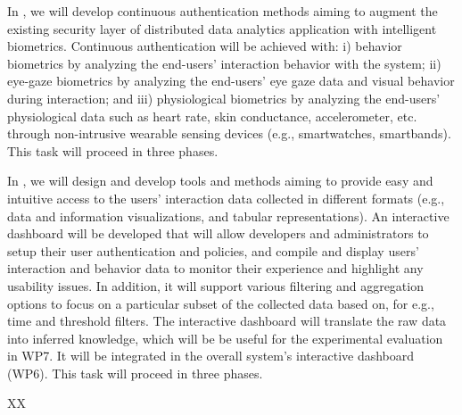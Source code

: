 \begin{Workpackage}{\thewpno}
\begin{Task}

\TaskResults{%
}
\TaskHeader{}

In \theTask, we will develop continuous authentication methods aiming to augment the existing security layer of distributed data analytics application with intelligent biometrics. Continuous authentication will be achieved with: i) behavior biometrics by analyzing the end-users' interaction behavior with the system; ii) eye-gaze biometrics by analyzing the end-users' eye gaze data and visual behavior during interaction; and iii) physiological biometrics by analyzing the end-users' physiological data such as heart rate, skin conductance, accelerometer, etc. through non-intrusive wearable sensing devices (e.g., smartwatches, smartbands).
This task will proceed in three phases. 
\end{Task}


\begin{Task}

\TaskResults{%
}
\TaskHeader{}

In \theTask, we will design and develop tools and methods aiming to provide easy and intuitive access to the users’ interaction data collected in different formats (e.g., data and information visualizations, and tabular representations). An interactive dashboard will be developed that will allow developers and administrators to setup their user authentication and policies, and compile and display users’ interaction and behavior data to monitor their experience and highlight any usability issues. In addition, it will support various filtering and aggregation options to focus on a particular subset of the collected data based on, for e.g., time and threshold filters. The interactive dashboard will translate the raw data into inferred knowledge, which will be be useful for the experimental evaluation in WP7. It will be integrated in the overall system's interactive dashboard (WP6). This task will proceed in three phases. 
\end{Task}



\begin{WPDeliverables}
  \begin{compactitem}
    \item XX
\end{compactitem}
\end{WPDeliverables}
\end{Workpackage}
